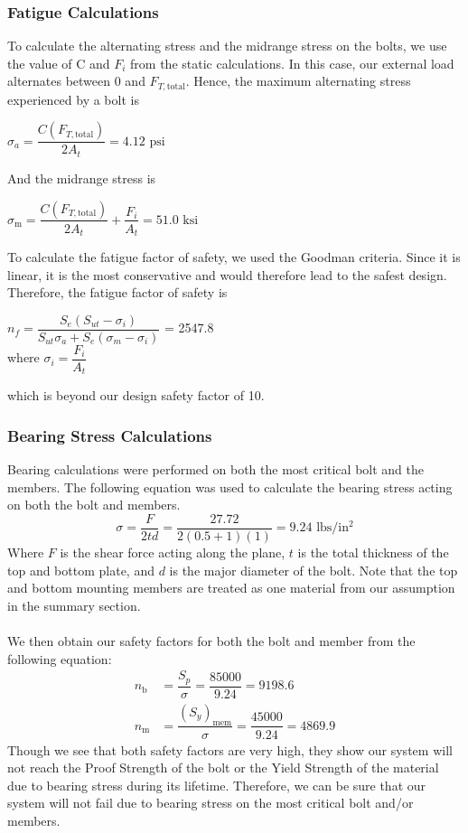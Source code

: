 \documentclass[letterpaper,12pt]{article}
\begin{document}
\subsubsection{Fatigue Calculations}
To calculate the alternating stress and the midrange stress on the bolts, we use the value of C and $F_{i}$ from the static calculations. 
In this case, our external load alternates between 0 and $F_{T,\text{total}}$. Hence, the maximum alternating stress experienced by a bolt is
\begin{center}
    $\sigma _ { a } = \dfrac { C ( F _ { T,\text{total}})  } { 2 A _ { t } } = 4.12 \text{ psi}$
\end{center}
And the midrange stress is
\begin{center}
    $\sigma _ { \mathrm { m } } = \dfrac { C( F_{T, \text{total}}) } { 2 A _ { t } } + \dfrac { F _ { i } } { A _ { t } } = 51.0 \text{ ksi}$
\end{center}
To calculate the fatigue factor of safety, we used the Goodman criteria. Since it is linear, it is the most conservative and would therefore lead to the safest design. Therefore, the fatigue factor of safety is
\begin{center}
    $n _ { f } = \dfrac { S _ { e } \left( S _ { u t } - \sigma _ { i } \right) } { S _ { u t } \sigma _ { a } + S _ { e } \left( \sigma _ { m } - \sigma _ { i } \right) }$ = 2547.8\\
    \bigskip
    where $\sigma_i = \dfrac{F_{i}}{A_{t}}$
\end{center}
which is beyond our design safety factor of 10.
\subsubsection{Bearing Stress Calculations}
Bearing calculations were performed on both the most critical bolt and the members. The following equation was used to calculate the bearing stress acting on both the bolt and members. 
\begin{equation*}
    \sigma = \dfrac{F}{2td} = \dfrac{27.72}{2(0.5+1)(1)} = 9.24 \text{ lbs/in$^2$}
\end{equation*}
Where $F$ is the shear force acting along the plane, $t$ is the total thickness of the top and bottom plate, and $d$ is the major diameter of the bolt. Note that the top and bottom mounting members are treated as one material from our assumption in the summary section.\\\\
We then obtain our safety factors for both the bolt and member from the following equation:
\begin{align*}
    n_{\text{b}} &= \dfrac{S_p}{\sigma} = \dfrac{85000}{9.24} = 9198.6\\
    n_{\text{m}} &= \dfrac{(S_y)_{\text{mem}}}{\sigma} = \dfrac{45000}{9.24} = 4869.9
\end{align*}
Though we see that both safety factors are very high, they show our system will not reach the Proof Strength of the bolt or the Yield Strength of the material due to bearing stress during its lifetime. Therefore, we can be sure that our system will not fail due to bearing stress on the most critical bolt and/or members.
\end{document}
